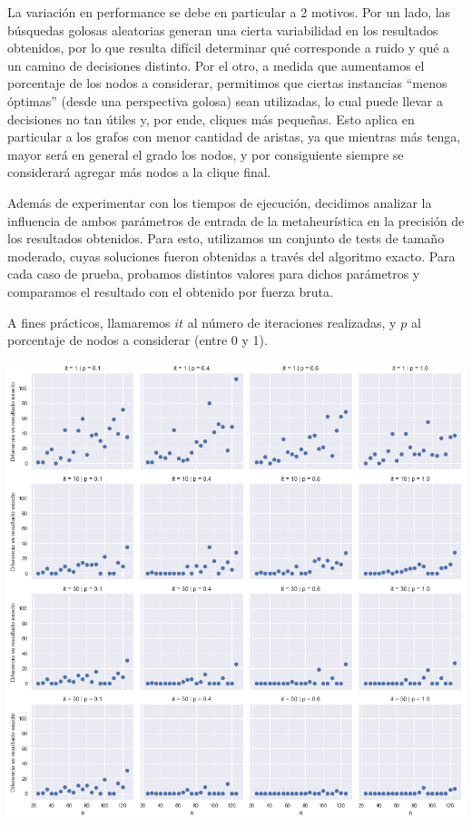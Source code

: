 La variación en performance se debe en particular a 2 motivos. Por un lado, las búsquedas golosas aleatorias generan una cierta variabilidad en los resultados obtenidos, por lo que resulta difícil determinar qué corresponde a ruido y qué a un camino de decisiones distinto. Por el otro, a medida que aumentamos el porcentaje de los nodos a considerar, permitimos que ciertas instancias ``menos óptimas'' (desde una perspectiva golosa) sean utilizadas, lo cual puede llevar a decisiones no tan útiles y, por ende, cliques más pequeñas. Esto aplica en particular a los grafos con menor cantidad de aristas, ya que mientras más tenga, mayor será en general el grado los nodos, y por consiguiente siempre se considerará agregar más nodos a la clique final.

Además de experimentar con los tiempos de ejecución, decidimos analizar la influencia de ambos parámetros de entrada de la metaheurística en la precisión de los resultados obtenidos. Para esto, utilizamos un conjunto de tests de tamaño moderado, cuyas soluciones fueron obtenidas a través del algoritmo exacto. Para cada caso de prueba, probamos distintos valores para dichos parámetros y comparamos el resultado con el obtenido por fuerza bruta.

A fines prácticos, llamaremos $it$ al número de iteraciones realizadas, y $p$ al porcentaje de nodos a considerar (entre 0 y 1).

\begin{center}
    \includegraphics[scale=0.6]{img/grasp-4x4.png}
\end{center}

